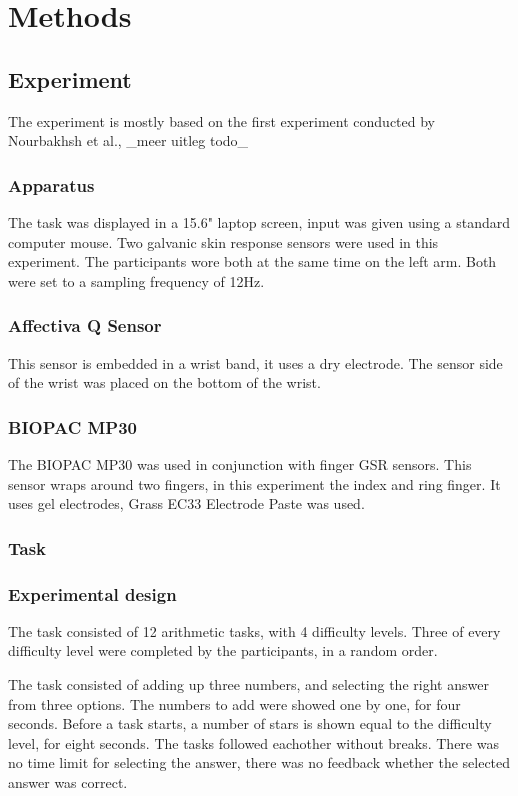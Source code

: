 \documentclass[12pt,fleqn,leqno,letterpaper]{article}
\begin{document}
\section{Methods}

\subsection{Experiment}
The experiment is mostly based on the first experiment conducted by Nourbakhsh et al., \_meer uitleg todo\_
\subsubsection{Apparatus}
The task was displayed in a 15.6" laptop screen, input was given using a standard computer mouse.
Two galvanic skin response sensors were used in this experiment. The participants wore both at the same time on the left arm. Both were set to a sampling frequency of 12Hz. 

\subsubsection{Affectiva Q Sensor}
This sensor is embedded in a wrist band, it uses a dry electrode. The sensor side of the wrist was placed on the bottom of the wrist.

\subsubsection{BIOPAC MP30}
The BIOPAC MP30 was used in conjunction with finger GSR sensors. This sensor wraps around two fingers, in this experiment the index and ring finger. It uses gel electrodes, Grass EC33 Electrode Paste was used.

\subsubsection{Task}

\subsubsection{Experimental design}
The task consisted of 12 arithmetic tasks, with 4 difficulty levels. Three of every difficulty level were completed by the participants, in a random order. 

The task consisted of adding up three numbers, and selecting the right answer from three options. The numbers to add were showed one by one, for four seconds. Before a task starts, a number of stars is shown equal to the difficulty level, for eight seconds. The tasks followed eachother without breaks. There was no time limit for selecting the answer, there was no feedback whether the selected answer was correct.
\end{document}

